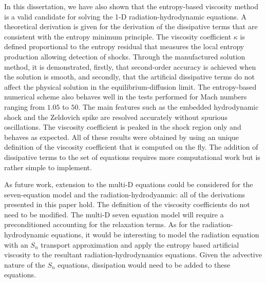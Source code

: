 In this dissertation, we have also shown that the entropy-based viscosity method is a valid candidate for solving the 1-D radiation-hydrodynamic equations. A theoretical derivation is given for the derivation of the dissipative terms that are consistent with the entropy minimum principle. The viscosity coefficient $\kappa$ is defined proportional to the entropy residual that measures the local entropy production allowing detection of shocks. Through the manufactured solution method, it is demonstrated, firstly, that second-order accuracy is achieved when the solution is smooth, and secondly, that the artificial dissipative terms do not affect the physical solution in the equilibrium-diffusion limit. 
The entropy-based numerical scheme also behaves well in the tests performed for Mach numbers ranging from $1.05$ to $50$. The main features such as the embedded hydrodynamic shock and the Zeldovich spike are resolved accurately without spurious oscillations. The viscosity coefficient is peaked in the shock region only and behaves as expected. All of these results were obtained by using an unique definition of the viscosity coefficient that is computed on the fly. The addition of dissipative terms to the set of equations requires more computational work but is rather simple to implement.

As future work, extension to the multi-D equations could be considered for the seven-equation model and the radiation-hydrodyanmic: all of the derivations presented in this paper hold. The definition of the viscosity coefficients do not need to be modified. The multi-D seven equation model will require a preconditioned accounting for the relaxation terms. As for the radiation-hydrodynamic equations, it would be interesting to model the radiation equation with an $S_n$ transport approximation and apply the entropy based artificial viscosity to the resultant radiation-hydrodynamics equations. Given the advective nature of the $S_n$ equations, dissipation would need to be added to these equations.